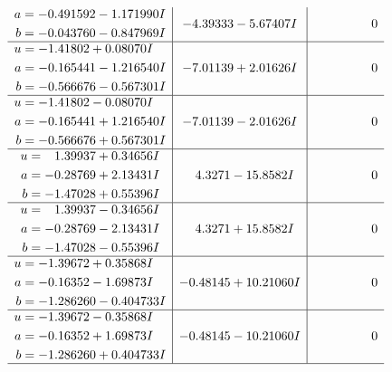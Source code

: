 \documentclass[1p]{elsarticle_modified}
\theoremstyle{definition}
\begin{document}
$$\begin{array}{c|c|c}
\begin{aligned}
a &= -0.491592 - 1.171990 I \\
b &= -0.043760 - 0.847969 I\end{aligned}
 & -4.39333 - 5.67407 I & \phantom{-0.000000 } 0 \\ \hline\begin{aligned}
u &= -1.41802 + 0.08070 I \\
a &= -0.165441 - 1.216540 I \\
b &= -0.566676 - 0.567301 I\end{aligned}
 & -7.01139 + 2.01626 I & \phantom{-0.000000 } 0 \\ \hline\begin{aligned}
u &= -1.41802 - 0.08070 I \\
a &= -0.165441 + 1.216540 I \\
b &= -0.566676 + 0.567301 I\end{aligned}
 & -7.01139 - 2.01626 I & \phantom{-0.000000 } 0 \\ \hline\begin{aligned}
u &= \phantom{-}1.39937 + 0.34656 I \\
a &= -0.28769 + 2.13431 I \\
b &= -1.47028 + 0.55396 I\end{aligned}
 & \phantom{-}4.3271 - 15.8582 I & \phantom{-0.000000 } 0 \\ \hline\begin{aligned}
u &= \phantom{-}1.39937 - 0.34656 I \\
a &= -0.28769 - 2.13431 I \\
b &= -1.47028 - 0.55396 I\end{aligned}
 & \phantom{-}4.3271 + 15.8582 I & \phantom{-0.000000 } 0 \\ \hline\begin{aligned}
u &= -1.39672 + 0.35868 I \\
a &= -0.16352 - 1.69873 I \\
b &= -1.286260 - 0.404733 I\end{aligned}
 & -0.48145 + 10.21060 I & \phantom{-0.000000 } 0 \\ \hline\begin{aligned}
u &= -1.39672 - 0.35868 I \\
a &= -0.16352 + 1.69873 I \\
b &= -1.286260 + 0.404733 I\end{aligned}
 & -0.48145 - 10.21060 I & \phantom{-0.000000 } 0\\
 \hline 
 \end{array}$$\newpage$$\begin{array}{c|c|c}  

\end{array}$$
\end{document}
